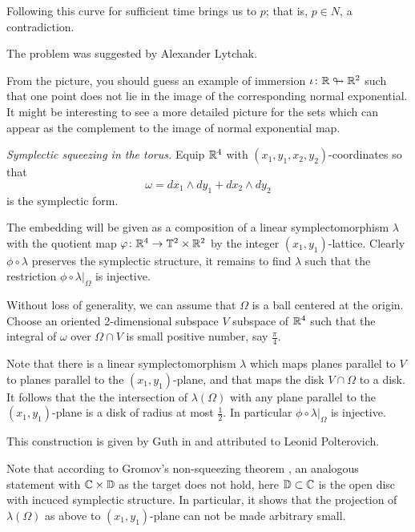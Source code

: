 Following this curve for sufficient time brings us to $p$;
that is, $p\in N$, a contradiction.

The problem was suggested by Alexander Lytchak.

From the picture, you should guess an example of immersion 
$\iota\colon\mathbb{R}\looparrowright\mathbb{R}^2$ 
such that one point does not lie in the image of the corresponding normal exponential.
It might be interesting to see a more detailed picture for the sets which can appear as the complement to the image of normal exponential map.



\textit{Symplectic squeezing in the torus.}
Equip $\mathbb{R}^4$ with $(x_1,y_1,x_2,y_2)$-coordinates
so that 
\[\omega=dx_1\wedge dy_1+dx_2\wedge dy_2\]
is the symplectic form. 

The embedding will be given as a composition of a linear symplectomorphism $\lambda$ 
with the quotient map $\varphi\colon\mathbb{R}^4\to \mathbb{T}^2\times\mathbb{R}^2$ by the integer $(x_1,y_1)$-lattice.
Clearly $\phi\circ\lambda$ preserves the symplectic structure,
it remains to find $\lambda$ such that the restriction $\phi\circ\lambda|_\Omega$
is injective.

Without loss of generality,
we can assume that $\Omega$ is a ball centered at the origin.
Choose an oriented 2-dimensional subspace $V$ subspace of $\mathbb{R}^4$ 
such that the integral of $\omega$ over 
$\Omega\cap V$ is small positive number, say $\tfrac\pi4$. 

Note that there is a linear symplectomorphism $\lambda$
 which maps planes parallel to $V$ to planes
parallel to the $(x_1,y_1)$-plane, 
and that maps the disk $V\cap\Omega$ to a disk.
It follows that the the intersection of $\lambda(\Omega)$ 
with any plane parallel to the $(x_1,y_1)$-plane is a disk of radius at most $\tfrac 12$.
In particular $\phi\circ\lambda|_\Omega$
is injective.

This construction is given by Guth in \cite{guth-symplectic}
and attributed to Leonid Polterovich.

Note that according to Gromov's non-squeezing theorem \cite{gromov-pseudoholomorphic}, 
an analogous statement with $\mathbb{C}\times \mathbb{D}$ as the target does not hold, here $\mathbb{D}\subset \mathbb{C}$ is the open disc with incuced symplectic structure.
In particular, it shows that
the projection of $\lambda(\Omega)$ as above 
to $(x_1,y_1)$-plane
can not be made arbitrary small.

